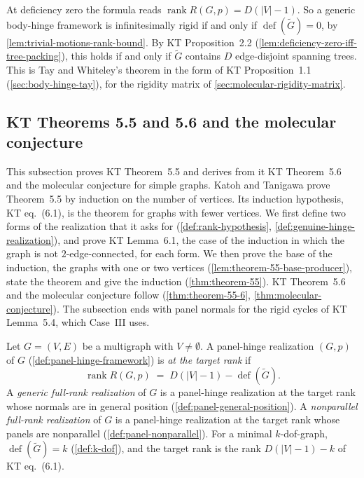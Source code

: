 At deficiency zero the formula reads
$\operatorname{rank} R(G,p) = D(|V|-1)$. So a generic body-hinge
framework is infinitesimally rigid if and only if
$\operatorname{def}(\tilde G) = 0$, by
\cref{lem:trivial-motions-rank-bound}. By KT Proposition~2.2
(\cref{lem:deficiency-zero-iff-tree-packing}), this holds if and only if
$\tilde G$ contains $D$ edge-disjoint spanning trees. This is Tay and
Whiteley's theorem in the form of KT Proposition~1.1
(\cref{sec:body-hinge-tay}), for the rigidity matrix of
\cref{sec:molecular-rigidity-matrix}.

\subsection{KT Theorems 5.5 and 5.6 and the molecular conjecture}
\label{sec:molecular-algebraic-induction-base}

This subsection proves KT Theorem~5.5 and derives from it KT Theorem~5.6
and the molecular conjecture for simple graphs. Katoh and Tanigawa prove
Theorem~5.5 by induction on the number of vertices. Its induction
hypothesis, KT eq.~(6.1), is the theorem for graphs with fewer vertices.
We first define two forms of the realization that it asks for
(\cref{def:rank-hypothesis}, \cref{def:genuine-hinge-realization}), and
prove KT Lemma~6.1, the case of the induction in which the graph is not
$2$-edge-connected, for each form. We then prove the base of the
induction, the graphs with one or two vertices
(\cref{lem:theorem-55-base-producer}), state the theorem and give the
induction (\cref{thm:theorem-55}).
KT Theorem~5.6 and the molecular conjecture follow
(\cref{thm:theorem-55-6}, \cref{thm:molecular-conjecture}). The
subsection ends with panel normals for the rigid cycles of KT Lemma~5.4,
which Case~III uses.

\begin{definition}
  \label{def:rank-hypothesis}
  \leanok
  Let $G = (V, E)$ be a multigraph with $V \neq \emptyset$. A panel-hinge
  realization $(G,p)$ of $G$ (\cref{def:panel-hinge-framework}) is
  \emph{at the target rank} if
  \[
    \operatorname{rank} R(G,p) \;=\; D(|V| - 1) - \operatorname{def}(\tilde G).
  \]
  A \emph{generic full-rank realization} of $G$ is a panel-hinge
  realization at the target rank whose normals are in general position
  (\cref{def:panel-general-position}). A \emph{nonparallel full-rank
  realization} of $G$ is a panel-hinge realization at the target rank
  whose panels are nonparallel (\cref{def:panel-nonparallel}). For a
  minimal $k$-dof-graph, $\operatorname{def}(\tilde G) = k$
  (\cref{def:k-dof}), and the target rank is the rank $D(|V| - 1) - k$ of
  KT eq.~(6.1).
\end{definition}


